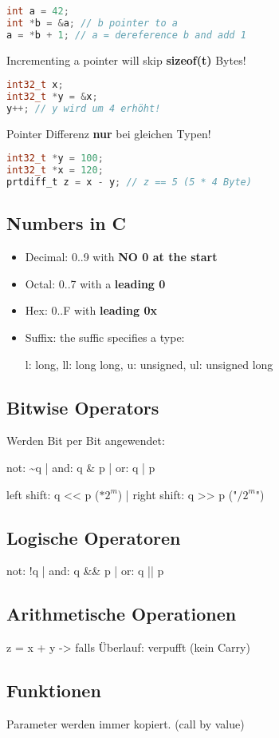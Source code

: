 \begin{multicols*}{4}
\begin{lstlisting}[language=c]
int a = 42;
int *b = &a; // b pointer to a
a = *b + 1; // a = dereference b and add 1
\end{lstlisting}
Incrementing a pointer will skip \textbf{sizeof(t)} Bytes!
\begin{lstlisting}[language=c]
int32_t x;
int32_t *y = &x;
y++; // y wird um 4 erhöht!
\end{lstlisting}
\vspace{2pt}
Pointer Differenz \textbf{nur} bei gleichen Typen!
\begin{lstlisting}[language=c]
int32_t *y = 100;
int32_t *x = 120;
prtdiff_t z = x - y; // z == 5 (5 * 4 Byte)
\end{lstlisting}

\subsection{Numbers in C}
\begin{itemize}
    \item Decimal: 0..9 with \textbf{NO 0 at the start}
    \item Octal: 0..7 with a \textbf{leading 0}
    \item Hex: 0..F with \textbf{leading 0x}
    \item Suffix: the suffic specifies a type:

    l: long, ll: long long, u: unsigned, ul: unsigned long
\end{itemize}

\subsection{Bitwise Operators}
Werden Bit per Bit angewendet:

not: \~{}q | and: q \& p | or: q | p

left shift: q << p ($* 2^m$) | right shift: q >> p ("$/ 2^m$")
\subsection{Logische Operatoren}
not: !q | and: q \&\& p | or: q || p

\subsection{Arithmetische Operationen}
z = x + y -> falls Überlauf: verpufft (kein Carry)

\subsection{Funktionen}
Parameter werden immer kopiert. (call by value)\vspace{2pt}


\end{multicols*}
